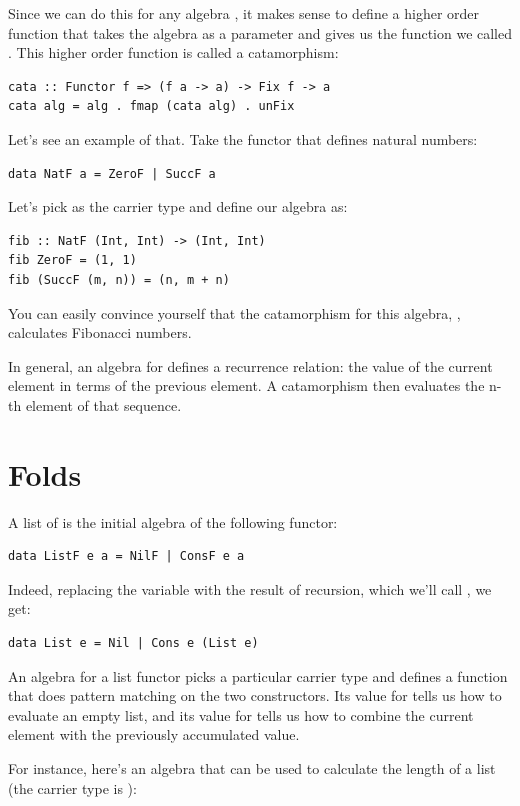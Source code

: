Since we can do this for any algebra , it makes sense to
define a higher order function that takes the algebra as a parameter and
gives us the function we called . This higher order function
is called a catamorphism:

\begin{verbatim}
cata :: Functor f => (f a -> a) -> Fix f -> a
cata alg = alg . fmap (cata alg) . unFix
\end{verbatim}
Let's see an example of that. Take the functor that defines natural
numbers:

\begin{verbatim}
data NatF a = ZeroF | SuccF a
\end{verbatim}
Let's pick  as the carrier type and define our
algebra as:

\begin{verbatim}
fib :: NatF (Int, Int) -> (Int, Int)
fib ZeroF = (1, 1)
fib (SuccF (m, n)) = (n, m + n)
\end{verbatim}
You can easily convince yourself that the catamorphism for this algebra,
, calculates Fibonacci numbers.

In general, an algebra for  defines a recurrence relation:
the value of the current element in terms of the previous element. A
catamorphism then evaluates the n-th element of that sequence.

\section{Folds}\label{folds}

A list of  is the initial algebra of the following functor:

\begin{verbatim}
data ListF e a = NilF | ConsF e a
\end{verbatim}
Indeed, replacing the variable  with the result of recursion,
which we'll call , we get:

\begin{verbatim}
data List e = Nil | Cons e (List e)
\end{verbatim}
An algebra for a list functor picks a particular carrier type and
defines a function that does pattern matching on the two constructors.
Its value for  tells us how to evaluate an empty list, and
its value for  tells us how to combine the current element
with the previously accumulated value.

For instance, here's an algebra that can be used to calculate the length
of a list (the carrier type is ):

